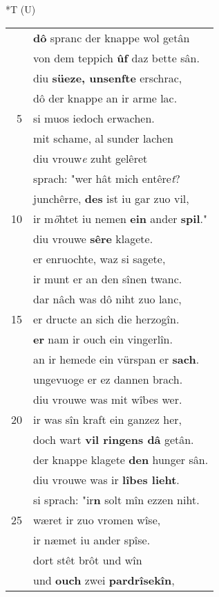 \documentclass[8pt,a4paper,notitlepage]{article}
\begin{document}
\begin{table}[ht]
\begin{minipage}[t]{0.5\linewidth}
\end{minipage}
\hspace{0.5cm}
\begin{minipage}[t]{0.5\linewidth}
\small
\begin{center}*T (U)
\end{center}
\begin{tabular}{rl}
 & \textbf{dô} spranc der knappe wol getân\\ 
 & von dem teppich \textbf{ûf} daz bette sân.\\ 
 & diu \textbf{süeze, unsenfte} erschrac,\\ 
 & dô der knappe an ir arme lac.\\ 
5 & si muos iedoch erwachen.\\ 
 & mit schame, al sunder lachen\\ 
 & diu vrouw\textit{e} zuht gelêret\\ 
 & sprach: "wer hât mich entêre\textit{t}?\\ 
 & junchêrre, \textbf{des} ist iu gar zuo vil,\\ 
10 & ir m\textit{ö}htet iu nemen \textbf{ein} ander \textbf{spil}."\\ 
 & diu vrouwe \textbf{sêre} klagete.\\ 
 & er enruochte, waz si sagete,\\ 
 & ir munt er an den sînen twanc.\\ 
 & dar nâch was dô niht zuo lanc,\\ 
15 & er dructe an sich die herzogîn.\\ 
 & \textbf{er} nam ir ouch ein vingerlîn.\\ 
 & an ir hemede ein vürspan er \textbf{sach}.\\ 
 & ungevuoge er ez dannen brach.\\ 
 & diu vrouwe was mit wîbes wer.\\ 
20 & ir was sîn kraft ein ganzez her,\\ 
 & doch wart \textbf{vil ringens dâ} getân.\\ 
 & der knappe klagete \textbf{den} hunger sân.\\ 
 & diu vrouwe was ir \textbf{lîbes lieht}.\\ 
 & si sprach: "ir\textbf{n} solt mîn ezzen niht.\\ 
25 & wæret ir zuo vromen wîse,\\ 
 & ir næmet iu ander spîse.\\ 
 & dort stêt brôt und wîn\\ 
 & und \textbf{ouch} zwei \textbf{pardrîsekîn},\\ 

\end{tabular}
\end{minipage}
\end{table}
\end{document}
